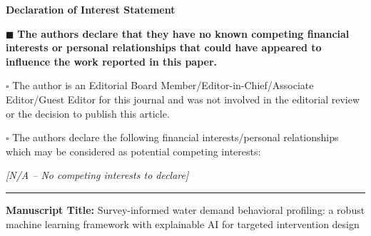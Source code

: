 \documentclass[a4paper,12pt]{article}
\begin{document}
\begin{center}
    \Large\textbf{Declaration of Interest Statement}
\end{center}

\vspace{1.5cm}

\noindent
$\blacksquare$ \textbf{The authors declare that they have no known competing financial interests or personal relationships that could have appeared to influence the work reported in this paper.}

\vspace{1.5cm}

\noindent
$\square$ The author is an Editorial Board Member/Editor-in-Chief/Associate Editor/Guest Editor for this journal and was not involved in the editorial review or the decision to publish this article.

\vspace{1.5cm}

\noindent
$\square$ The authors declare the following financial interests/personal relationships which may be considered as potential competing interests:

\vspace{0.5cm}

\noindent
\textit{[N/A -- No competing interests to declare]}

\vspace{2cm}

\noindent
\rule{\textwidth}{0.4pt}

\vspace{0.5cm}

\noindent
\textbf{Manuscript Title:} Survey-informed water demand behavioral profiling: a robust machine learning framework with explainable AI for targeted intervention design

\vspace{0.5cm}
\end{document}
